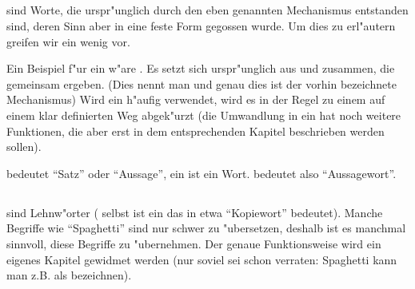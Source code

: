 \subsection{}
 sind Worte, die urspr"unglich durch den eben genannten Mechanismus entstanden sind, deren Sinn aber in eine feste Form gegossen wurde. Um dies zu erl"autern greifen
wir ein wenig vor.

Ein Beispiel f"ur ein  w"are . Es setzt sich urspr"unglich aus  und  zusammen, die gemeinsam  ergeben. (Dies nennt
man  und genau dies ist der vorhin bezeichnete Mechanismus)
Wird ein  h"aufig verwendet, wird es in der Regel zu einem  auf einem klar definierten Weg abgek"urzt (die Umwandlung in ein  hat noch weitere
Funktionen, die aber erst in dem entsprechenden Kapitel beschrieben werden sollen).

 bedeutet ``Satz'' oder ``Aussage'', ein  ist ein Wort.  bedeutet also ``Aussagewort''.

\subsection{}
 sind Lehnw"orter ( selbst ist ein  das in etwa ``Kopiewort'' bedeutet). Manche Begriffe wie ``Spaghetti'' sind nur schwer zu "ubersetzen,
deshalb ist es manchmal sinnvoll, diese Begriffe zu "ubernehmen. Der genaue Funktionsweise wird ein eigenes Kapitel gewidmet werden (nur soviel sei schon verraten: Spaghetti
kann man z.B. als  bezeichnen).

